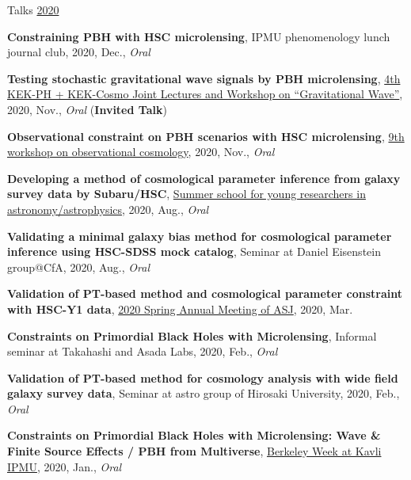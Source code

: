 \begin{rSection}{Talks}
\underline{2020}
\begin{etaremune}
\setcounter{enumi}{16}
\item \textbf{Constraining PBH with HSC microlensing}, IPMU phenomenology lunch journal club, 2020, Dec., \textit{Oral}
\item \textbf{Testing stochastic gravitational wave signals by PBH microlensing}, \href{http://conference-indico.kek.jp/event/117/timetable/#day-2020-11-04}{4th KEK-PH + KEK-Cosmo Joint Lectures and Workshop on ``Gravitational Wave''}, 2020, Nov., \textit{Oral} (\textbf{Invited Talk})
\item \textbf{Observational constraint on PBH scenarios with HSC microlensing}, \href{https://indico.ipmu.jp/event/382/timetable/#all}{9th workshop on observational cosmology}, 2020, Nov., \textit{Oral}
\item \textbf{Developing a method of cosmological parameter inference from galaxy survey data by Subaru/HSC}, \href{http://www.astro-wakate.org/ss2019/web/}{Summer school for young researchers in astronomy/astrophysics}, 2020, Aug., \textit{Oral}
\item \textbf{Validating a minimal galaxy bias method for cosmological parameter inference using HSC-SDSS mock catalog}, Seminar at Daniel Eisenstein group@CfA, 2020, Aug., \textit{Oral}
\item \textbf{Validation of PT-based method and cosmological parameter constraint with HSC-Y1 data}, \href{http://www.asj.or.jp/nenkai/archive/2020a/pdf/U03a.pdf}{2020 Spring Annual Meeting of ASJ}, 2020, Mar.
\item \textbf{Constraints on Primordial Black Holes with Microlensing}, Informal seminar at Takahashi and Asada Labs, 2020, Feb., \textit{Oral}
\item \textbf{Validation of PT-based method for cosmology analysis with wide field galaxy survey data}, Seminar at astro group of Hirosaki University, 2020, Feb., \textit{Oral}
\item \textbf{Constraints on Primordial Black Holes with Microlensing: Wave \& Finite Source Effects / PBH from Multiverse}, \href{http://indico.ipmu.jp/event/313/overview}{Berkeley Week at Kavli IPMU}, 2020, Jan., \textit{Oral}
\end{etaremune}


\end{rSection}
